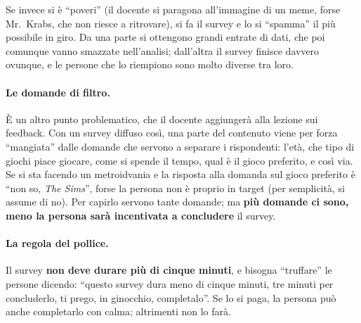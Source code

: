 Se invece si è ``poveri'' (il docente si paragona all'immagine di un meme,
forse Mr.~Krabs, che non riesce a ritrovare), si fa il survey e lo si
``spamma'' il più possibile in giro. Da una parte si ottengono grandi entrate
di dati, che poi comunque vanno smazzate nell'analisi; dall'altra il survey
finisce davvero ovunque, e le persone che lo riempiono sono molto diverse tra
loro.

\paragraph{Le domande di filtro.} È un altro punto problematico, che il
docente aggiungerà alla lezione sui feedback. Con un survey diffuso così, una
parte del contenuto viene per forza ``mangiata'' dalle domande che servono a
separare i rispondenti: l'età, che tipo di giochi piace giocare, come si
spende il tempo, qual è il gioco preferito, e così via. Se si sta facendo un
metroidvania e la risposta alla domanda sul gioco preferito è ``non so,
\emph{The Sims}'', forse la persona non è proprio in target (per semplicità,
si assume di no). Per capirlo servono tante domande; ma \textbf{più domande ci
sono, meno la persona sarà incentivata a concludere} il survey.

\paragraph{La regola del pollice.} Il survey \textbf{non deve durare più di
cinque minuti}, e bisogna ``truffare'' le persone dicendo: ``questo survey dura
meno di cinque minuti, tre minuti per concluderlo, ti prego, in ginocchio,
completalo''. Se lo si paga, la persona può anche completarlo con calma;
altrimenti non lo farà.

